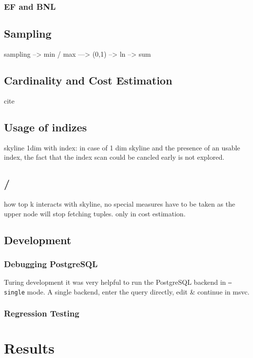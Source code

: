 \subsection{EF and BNL}

\section{Sampling}

sampling --> min / max  ---> (0,1) --> ln   --> sum

\section{Cardinality and Cost Estimation}

cite \citep{Buchta1989}

\section{Usage of indizes}
skyline 1dim with index: in case of 1 dim skyline and the presence of an usable index, the fact that the index scan could be cancled early is not explored.

\section{ / }
how top k interacts with skyline, no special measures have to be taken as the upper node will stop fetching tuples. only in cost estimation.


\section{Development}
\subsection{Debugging PostgreSQL}
Turing development it was very helpful to run the PostgreSQL backend in \texttt{--single} mode. A single backend, enter the query directly, edit \& continue in msvc.


\subsection{Regression Testing}

\chapter{Results\revision}
\label{chap:Results}


